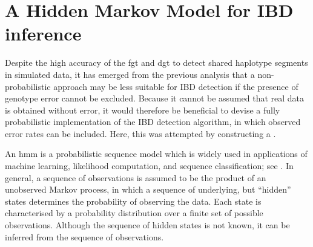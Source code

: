 



%
\section{A Hidden Markov Model for IBD inference}
\label{sec:ibd_hmm_method}
%

Despite the high accuracy of the \gls{fgt} and \gls{dgt} to detect shared haplotype segments in simulated data, it has emerged from the previous analysis that a non-probabilistic approach may be less suitable for IBD detection if the presence of genotype error cannot be excluded.
Because it cannot be assumed that real data is obtained without error, it would therefore be beneficial to devise a fully probabilistic implementation of the IBD detection algorithm, in which observed error rates can be included.
Here, this was attempted by constructing a .

An \gls{hmm} is a probabilistic sequence model which is widely used in applications of machine learning, likelihood computation, and sequence classification; see \citet{Rabiner:1989hs}.
In general, a sequence of observations is assumed to be the product of an unobserved Markov process, in which a sequence of underlying, but ``hidden'' states determines the probability of observing the data.
Each state is characterised by a probability distribution over a finite set of possible observations.
Although the sequence of hidden states is not known, it can be inferred from the sequence of observations.


